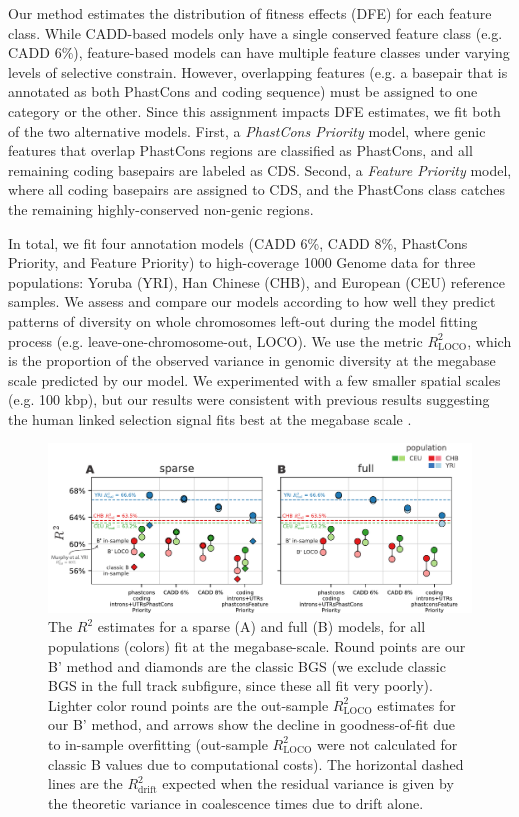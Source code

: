 \documentclass[11pt]{article}
\begin{document}
Our method estimates the distribution of fitness effects (DFE) for each feature
class. While CADD-based models only have a single conserved feature class (e.g.
CADD 6\%), feature-based models can have multiple feature classes under varying
levels of selective constrain. However, overlapping features (e.g. a basepair
that is annotated as both PhastCons and coding sequence) must be assigned to
one category or the other. Since this assignment impacts DFE estimates, we fit
both of the two alternative models. First, a \emph{PhastCons Priority} model,
where genic features that overlap PhastCons regions are classified as
PhastCons, and all remaining coding basepairs are labeled as CDS. Second, a
\emph{Feature Priority} model, where all coding basepairs are assigned to CDS,
and the PhastCons class catches the remaining highly-conserved non-genic
regions. 

In total, we fit four annotation models (CADD 6\%, CADD 8\%, PhastCons
Priority, and Feature Priority) to high-coverage 1000 Genome data for three
populations: Yoruba (YRI), Han Chinese (CHB), and European (CEU) reference
samples. We assess and compare our models according to how well they predict
patterns of diversity on whole chromosomes left-out during the model fitting
process (e.g. leave-one-chromosome-out, LOCO). We use the metric
$R_\text{LOCO}^2$, which is the proportion of the observed variance in genomic
diversity at the megabase scale predicted by our model. We experimented with a
few smaller spatial scales (e.g. 100 kbp), but our results were consistent with
previous results suggesting the human linked selection signal fits best at the
megabase scale \parencite{Murphy2022-sj}.

\begin{figure}[htbp] \centering
    \includegraphics[width=\textwidth]{figures/figure_3.pdf} 

    \caption{The $R^2$ estimates for a sparse (A) and full (B) models, for all
        populations (colors) fit at the megabase-scale. Round points are our B'
        method and diamonds are the classic BGS (we exclude classic BGS in the
        full track subfigure, since these all fit very poorly). Lighter color
        round points are the out-sample $R_\text{LOCO}^2$ estimates for our B'
        method, and arrows show the decline in goodness-of-fit due to in-sample
        overfitting (out-sample $R_\text{LOCO}^2$ were not calculated for
        classic B values due to computational costs). The horizontal dashed
        lines are the $R_\text{drift}^2$ expected when the residual variance is
    given by the theoretic variance in coalescence times due to drift alone.}

  \label{fig:figure-3}
\end{figure}
\end{document}
